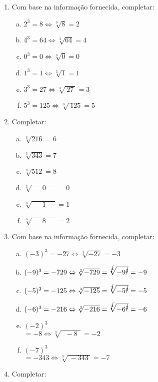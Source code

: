 \documentclass[a4paper,14pt]{article}
\begin{document}
\begin{multicols}{2}
\begin{enumerate}
		\item Com base na informação fornecida, completar:
		\begin{enumerate}[a)]
			\item $2^3 = 8 \Leftrightarrow \sqrt[3]{8} = 2$
			\item $4^3 = 64 \Leftrightarrow \sqrt[3]{64} = 4$
			\item $0^3 = 0 \Leftrightarrow \sqrt[3]{0} = 0$
			\item $1^3 = 1 \Leftrightarrow \sqrt[3]{1} = 1$
			\item $3^3 = 27 \Leftrightarrow \sqrt[3]{~27~} = 3$
			\item $5^3 = 125 \Leftrightarrow \sqrt[3]{~125} = 5$
	    \end{enumerate}
    	\item Completar:
        \begin{enumerate}[a)]
        	\item $\sqrt[3]{216} = 6$
        	\item $\sqrt[3]{343} = 7$
        	\item $\sqrt[3]{512} = 8$
        	\item $\sqrt[3]{~~~~~~~0~~~~~~} = 0$
        	\item $\sqrt[3]{~~~~~~~1~~~~~~} = 1$
        	\item $\sqrt[3]{~~~~~~~8~~~~~~} = 2$        	
        \end{enumerate}
		\item Com base na informação fornecida, completar:
    	\begin{enumerate}[a)]
    		\item $(-3)^3 = -27 \Leftrightarrow \sqrt[3]{-27} = -3$
    		\item $(-9)^3 = -729 \Leftrightarrow \sqrt[3]{-729}= \sqrt[\cancel{3}]{-9^{\cancel{3}}} = -9$
    		\item $(-5)^3 = -125 \Leftrightarrow \sqrt[3]{-125} = \sqrt[\cancel{3}]{-5^{\cancel{3}}} = -5$
    		\item $(-6)^3 = -216 \Leftrightarrow \sqrt[3]{-216} = \sqrt[\cancel{3}]{-6^{\cancel{3}}} = -6$
    		\item $(-2)^3$ \\ $= -8 \Leftrightarrow \sqrt[3]{~~~-8~~} = -2$
    		\item $(-7)^3$ \\ $= -343 \Leftrightarrow \sqrt[3]{~-343~} = -7$
    	\end{enumerate}
        \item Completar:
        \begin{enumerate}[a)]

\end{enumerate}
\end{enumerate}
\end{multicols}
\end{document}
